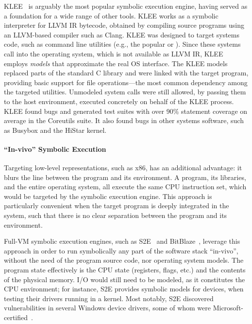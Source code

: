 KLEE~\cite{klee} is arguably the most popular symbolic execution engine, having served as a foundation for a wide range of other tools.
%
KLEE works as a symbolic interpreter for LLVM IR bytecode, obtained by compiling source programs using an LLVM-based compiler such as Clang.
%
KLEE was designed to target systems code, such as command line utilities (e.g., the popular  or ).  Since these systems call into the operating system, which is not available as LLVM IR, KLEE employs \emph{models} that approximate the real OS interface.
%
The KLEE models replaced parts of the standard C library and were linked with the target program, providing basic support for file operations---the most common dependency among the targeted utilities.
%
Unmodeled system calls were still allowed, by passing them to the host environment, executed concretely on behalf of the KLEE process.
%
KLEE found bugs and generated test suites with over 90\% statement coverage on average in the Coreutils suite.  It also found bugs in other systems software, such as Busybox and the HiStar kernel.

\paragraph{``In-vivo'' Symbolic Execution}

Targeting low-level representations, such as x86, has an additional advantage: it blurs the line between the program and its environment.  A program, its libraries, and the entire operating system, all execute the same CPU instruction set, which would be targeted by the symbolic execution engine.
%
This approach is particularly convenient when the target program is deeply integrated in the system, such that there is no clear separation between the program and its environment.

Full-VM symbolic execution engines, such as S2E~\cite{s2eSystem} and BitBlaze~\cite{bitBlaze}, leverage this approach in order to run symbolically any part of the software stack ``in-vivo'', without the need of the program source code, nor operating system models.
%
The program state effectively is the CPU state (registers, flags, etc.) and the contents of the physical memory.
%
I/O would still need to be modeled, as it constitutes the CPU environment; for instance, S2E provides symbolic models for devices, when testing their drivers running in a kernel.
%
Most notably, S2E discovered vulnerabilities in several Windows device drivers, some of whom were Microsoft-certified~\cite{ddt}.


